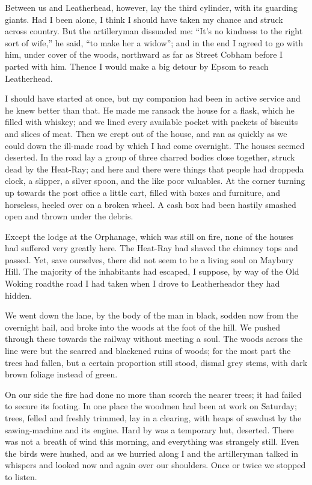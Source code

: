 Between us and Leatherhead, however, lay the third cylinder, with
its guarding giants. Had I been alone, I think I should have taken
my chance and struck across country. But the artilleryman dissuaded
me: ``It's no kindness to the right sort of wife,'' he said, ``to make
her a widow''; and in the end I agreed to go with him, under cover
of the woods, northward as far as Street Cobham before I parted
with him. Thence I would make a big detour by Epsom to reach
Leatherhead.

I should have started at once, but my companion had been in active
service and he knew better than that. He made me ransack the house
for a flask, which he filled with whiskey; and we lined every
available pocket with packets of biscuits and slices of meat. Then
we crept out of the house, and ran as quickly as we could down the
ill-made road by which I had come overnight. The houses seemed
deserted. In the road lay a group of three charred bodies close
together, struck dead by the Heat-Ray; and here and there were
things that people had dropped\dash{}a clock, a slipper, a silver spoon,
and the like poor valuables. At the corner turning up towards the
post office a little cart, filled with boxes and furniture, and
horseless, heeled over on a broken wheel. A cash box had been
hastily smashed open and thrown under the debris.

Except the lodge at the Orphanage, which was still on fire, none of
the houses had suffered very greatly here. The Heat-Ray had shaved
the chimney tops and passed. Yet, save ourselves, there did not
seem to be a living soul on Maybury Hill. The majority of the
inhabitants had escaped, I suppose, by way of the Old Woking
road\dash{}the road I had taken when I drove to Leatherhead\dash{}or they had
hidden.

We went down the lane, by the body of the man in black, sodden now
from the overnight hail, and broke into the woods at the foot of
the hill. We pushed through these towards the railway without
meeting a soul. The woods across the line were but the scarred and
blackened ruins of woods; for the most part the trees had fallen,
but a certain proportion still stood, dismal grey stems, with dark
brown foliage instead of green.

On our side the fire had done no more than scorch the nearer trees;
it had failed to secure its footing. In one place the woodmen had
been at work on Saturday; trees, felled and freshly trimmed, lay in
a clearing, with heaps of sawdust by the sawing-machine and its
engine. Hard by was a temporary hut, deserted. There was not a
breath of wind this morning, and everything was strangely still.
Even the birds were hushed, and as we hurried along I and the
artilleryman talked in whispers and looked now and again over our
shoulders. Once or twice we stopped to listen.

